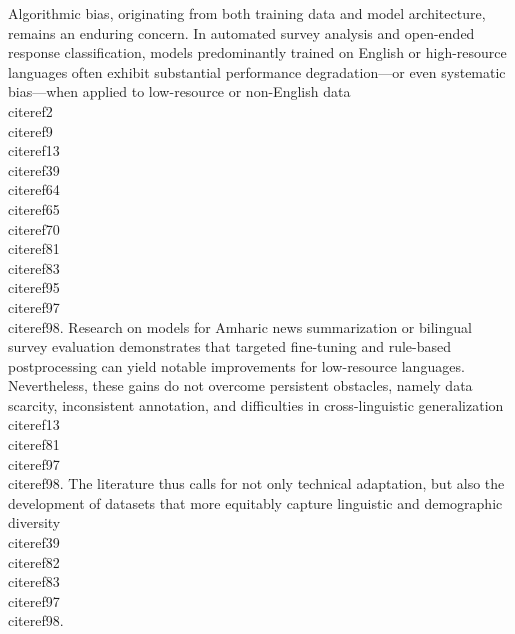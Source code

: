 \documentclass[11pt]{article}
\begin{document}
Algorithmic bias, originating from both training data and model architecture, remains an enduring concern. In automated survey analysis and open-ended response classification, models predominantly trained on English or high-resource languages often exhibit substantial performance degradation—or even systematic bias—when applied to low-resource or non-English data \\cite{ref2}\\cite{ref9}\\cite{ref13}\\cite{ref39}\\cite{ref64}\\cite{ref65}\\cite{ref70}\\cite{ref81}\\cite{ref83}\\cite{ref95}\\cite{ref97}\\cite{ref98}. Research on models for Amharic news summarization or bilingual survey evaluation demonstrates that targeted fine-tuning and rule-based postprocessing can yield notable improvements for low-resource languages. Nevertheless, these gains do not overcome persistent obstacles, namely data scarcity, inconsistent annotation, and difficulties in cross-linguistic generalization \\cite{ref13}\\cite{ref81}\\cite{ref97}\\cite{ref98}. The literature thus calls for not only technical adaptation, but also the development of datasets that more equitably capture linguistic and demographic diversity \\cite{ref39}\\cite{ref82}\\cite{ref83}\\cite{ref97}\\cite{ref98}. 
\end{document}
